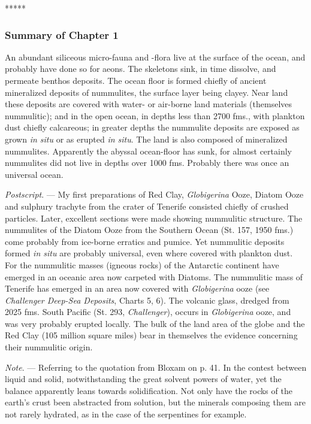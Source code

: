 \documentclass[a4paper, 12pt, oneside]{article}
\begin{document}
\centerline{*\hspace{15mm}*\hspace{15mm}*\hspace{15mm}*\hspace{15mm}*}
\bigskip

\subsubsection{Summary of Chapter 1}

An abundant siliceous micro-fauna and -flora live at the surface of the ocean, and probably have done so for aeons. The skeletons sink, in time dissolve, and permeate benthos deposits. The ocean floor is formed chiefly of ancient mineralized deposits of nummulites, the surface layer being clayey. Near land these deposits are covered with water- or air-borne land materials (themselves nummulitic); and in the open ocean, in depths less than 2700 fms., with plankton dust chiefly calcareous; in greater depths the nummulite deposits are exposed as grown \emph{in situ} or as erupted \emph{in situ}. The land is also composed of mineralized nummulites. Apparently the abyssal ocean-floor has sunk, for almost certainly nummulites did not live in depths over 1000 fms. Probably there was once an universal ocean.

\emph{Postscript}. --- My first preparations of Red Clay, \emph{Globigerina} Ooze, Diatom Ooze and sulphury trachyte from the crater of Tenerife consisted chiefly of crushed particles. Later, excellent sections were made showing nummulitic structure. The nummulites of the Diatom Ooze from the Southern Ocean (St. 157, 1950 fms.) come probably from ice-borne erratics and pumice. Yet nummulitic deposits formed \emph{in situ} are probably universal, even where covered with plankton dust. For the nummulitic masses (igneous rocks) of the Antarctic continent have emerged in an oceanic area now carpeted with Diatoms. The nummulitic mass of Tenerife has emerged in an area now covered with \emph{Globigerina} ooze (see \emph{Challenger Deep-Sea Deposits}, Charts 5, 6). The volcanic glass, dredged from 2025 fms. South Pacific (St. 293, \emph{Challenger}), occurs in \emph{Globigerina} ooze, and was very probably erupted locally. The bulk of the land area of the globe and the Red Clay (105 million square miles) bear in themselves the evidence concerning their nummulitic origin.

\emph{Note}. --- Referring to the quotation from Bloxam on p. 41. In the contest between liquid and solid, notwithstanding the great solvent powers of water, yet the balance apparently leans towards solidification. Not only have the rocks of the earth's crust been abstracted from solution, but the minerals composing them are not rarely hydrated, as in the case of the serpentines for example.
\clearpage
\end{document}
